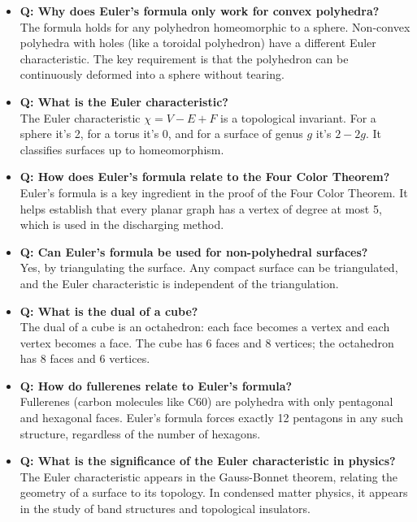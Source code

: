 \begin{itemize}
\item \textbf{Q: Why does Euler's formula only work for convex polyhedra?} \\
The formula holds for any polyhedron homeomorphic to a sphere. Non-convex polyhedra with holes (like a toroidal polyhedron) have a different Euler characteristic. The key requirement is that the polyhedron can be continuously deformed into a sphere without tearing.

\item \textbf{Q: What is the Euler characteristic?} \\
The Euler characteristic $\chi = V - E + F$ is a topological invariant. For a sphere it's 2, for a torus it's 0, and for a surface of genus $g$ it's $2 - 2g$. It classifies surfaces up to homeomorphism.

\item \textbf{Q: How does Euler's formula relate to the Four Color Theorem?} \\
Euler's formula is a key ingredient in the proof of the Four Color Theorem. It helps establish that every planar graph has a vertex of degree at most 5, which is used in the discharging method.

\item \textbf{Q: Can Euler's formula be used for non-polyhedral surfaces?} \\
Yes, by triangulating the surface. Any compact surface can be triangulated, and the Euler characteristic is independent of the triangulation.

\item \textbf{Q: What is the dual of a cube?} \\
The dual of a cube is an octahedron: each face becomes a vertex and each vertex becomes a face. The cube has 6 faces and 8 vertices; the octahedron has 8 faces and 6 vertices.

\item \textbf{Q: How do fullerenes relate to Euler's formula?} \\
Fullerenes (carbon molecules like C60) are polyhedra with only pentagonal and hexagonal faces. Euler's formula forces exactly 12 pentagons in any such structure, regardless of the number of hexagons.

\item \textbf{Q: What is the significance of the Euler characteristic in physics?} \\
The Euler characteristic appears in the Gauss-Bonnet theorem, relating the geometry of a surface to its topology. In condensed matter physics, it appears in the study of band structures and topological insulators.


\end{itemize}
